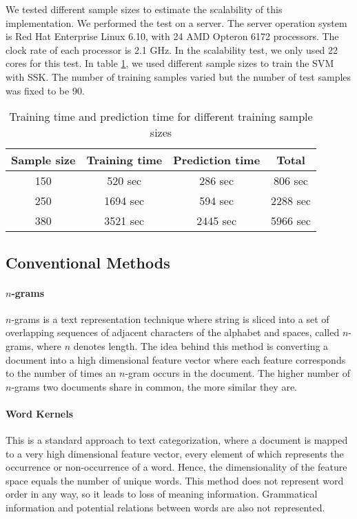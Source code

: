 \documentclass{article}
\begin{document}
We tested different sample sizes to estimate the scalability of this implementation. We performed the test on a server. The server operation system is Red Hat Enterprise Linux 6.10, with 24 AMD Opteron 6172 processors. The clock rate of each processor is 2.1 GHz. In the scalability test, we only used 22 cores for this test. In table \ref{scale_sample},
we used different sample sizes to train the SVM with SSK. The number of training samples varied but the number of test samples was fixed to be 90.

\begin{table}[!htbp]
\centering
\caption{Training time and prediction time for different training sample sizes}
\label{scale_sample}
    \begin{tabular}{| c | c | c | c |}
    \hline
    Sample size & Training time & Prediction time & Total \\ \hline
    150 & 520 sec & 286 sec & 806 sec \\ \hline
    250 & 1694 sec & 594 sec & 2288 sec \\ \hline
    380 & 3521 sec & 2445 sec & 5966 sec \\ \hline
    \end{tabular}
\end{table}

\FloatBarrier
\subsection{Conventional Methods}

\paragraph{$n$-grams}

$n$-grams is a text representation technique where string is sliced into a set of overlapping sequences of adjacent characters of the alphabet and spaces, called $n$-grams, where $n$ denotes length. The idea behind this method is converting a document into a high dimensional feature vector where each feature corresponds to the number of times an $n$-gram occurs in the document. The higher number of $n$-grams two documents share in common, the more similar they are.

\paragraph{Word Kernels}

This is a standard approach to text categorization, where a document is mapped to a very high dimensional feature vector, every element of which represents the occurrence or non-occurrence of a word. Hence, the dimensionality of the feature space equals the number of unique words. This method does not represent word order in any way, so it leads to loss of meaning information. Grammatical information and potential relations between words are also not represented.
\end{document}

